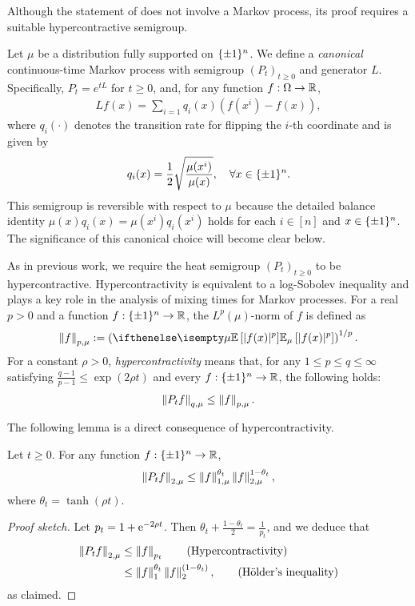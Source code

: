 Although the statement of  does not involve a Markov process, its proof requires a suitable hypercontractive semigroup.

Let $\mu$ be a distribution fully supported on $\{\pm 1\}^n$. 
We define a \emph{canonical} continuous-time Markov process with semigroup $(P_t)_{t\ge 0}$ and generator $L$. Specifically, $P_t = e^{t L}$ for $t \ge 0$, and, for any function $f: \Omega \to \mathbb{R}$,
\begin{align*}
    Lf(x) = \sum_{i=1} q_i(x) (f(x^i)-f(x)),
\end{align*}
where $q_i(\cdot)$ denotes the transition rate for flipping the $i$-th coordinate and is given by
\begin{align*}
    q_i(x) = \frac{1}{2} \sqrt{\frac{\mu(x^i)}{\mu(x)}}, \quad \forall x \in \{\pm 1\}^n.
\end{align*}
This semigroup is reversible with respect to $\mu$ because the detailed balance identity $\mu(x) q_i(x) = \mu(x^i) q_i(x^i)$ holds for each $i \in [n]$ and $x \in \{\pm 1\}^n$. The significance of this canonical choice will become clear below.

As in previous work, we require the heat semigroup $(P_t)_{t\ge 0}$ to be hypercontractive. Hypercontractivity is equivalent to a log-Sobolev inequality and plays a key role in the analysis of mixing times for Markov processes.
For a real $p > 0$ and a function $f: \{\pm 1\}^n \to \mathbb{R}$, the $L^p(\mu)$-norm of $f$ is defined as
\begin{align*}
    \norm{f}_{p,\mu} := \left( \E[\mu]{|f(x)|^p} \right)^{1/p}.
\end{align*}
For a constant $\rho >0$, \emph{hypercontractivity} means that, for any $1\leq p \leq q \leq \infty$ satisfying $\frac{q-1}{p-1}\leq \exp(2\rho t)$ and every $f: \{\pm 1\}^n \to \mathbb{R}$, the following holds:
\begin{align}\label{eq:hypercontractivity-intro}
    \left\lVert P_t f \right\rVert_{q,\mu} \leq \left\lVert f \right\rVert_{p,\mu}.
\end{align}

The following lemma is a direct consequence of hypercontractivity.
\begin{lemma}\label{lem:hypercontractivity}
    Let $t \ge 0$. For any function $f: \{\pm 1\}^n \to \mathbb{R}$,
    \begin{align*}
        \left\lVert P_t f \right\rVert_{2,\mu} \le \left\lVert f \right\rVert_{1,\mu}^{\theta_t} \left\lVert f \right\rVert_{2,\mu}^{1-\theta_t},
    \end{align*}
    where $\theta_t = \tanh (\rho t)$.
\end{lemma}
\begin{proof}[Proof sketch]
    Let $p_t = 1 + \mathrm{e}^{-2\rho t}$. Then $\theta_t + \frac{1-\theta_t}{2} = \frac{1}{p_t}$, and we deduce that
    \begin{align}
        \left\lVert P_t f \right\rVert_{2,\mu} 
        &\le \left\lVert f \right\rVert_{p_t} \tag{Hypercontractivity} \\
        &\le \left\lVert f \right\rVert_{1}^{\theta_t} \left\lVert f \right\rVert_2^{(1-\theta_t)}, \tag{H\"older's inequality}
    \end{align}
    as claimed.
\end{proof}




